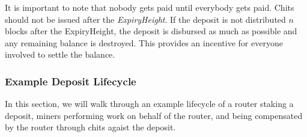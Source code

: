 \documentclass[10pt, nonatbib, nocopyrightspace, reprint]{sigplanconf}
\begin{document}
It is important to note that nobody gets paid until everybody gets paid. Chits should not be issued after the \emph{ExpiryHeight}. If the deposit is not distributed $n$ blocks after the ExpiryHeight, the deposit is disbursed as much as possible and any remaining balance is destroyed. This provides an incentive for everyone involved to settle the balance.

\subsubsection{Example Deposit Lifecycle}

In this section, we will walk through an example lifecycle of a router staking a deposit, miners performing work on behalf of the router, and being compensated by the router through chits agaist the deposit.
\end{document}
